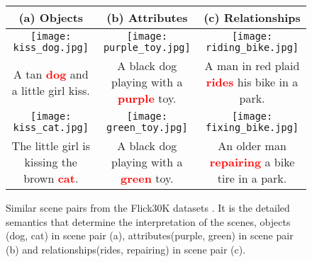 \documentclass[letterpaper]{article} \usepackage{aaai21}  \usepackage{times}  \usepackage{helvet} \usepackage{courier}  \usepackage[hyphens]{url}  \usepackage{graphicx} \urlstyle{rm} \def\UrlFont{\rm}  \usepackage{natbib}  \usepackage{caption} \frenchspacing  \setlength{\pdfpagewidth}{8.5in}  \setlength{\pdfpageheight}{11in}  \usepackage{cite}
\begin{document}
\begin{figure*}[t]
\centering
\begin{tabular}{ccc} 
\multicolumn{1}{c}{(a) Objects}  & \multicolumn{1}{c}{(b) Attributes}   & \multicolumn{1}{c}{(c) Relationships}         \\ 
\hline
\begin{minipage}{0.3\textwidth}
\centering
\texttt{[image: kiss\_dog.jpg]}
\end{minipage}
 & 
 \begin{minipage}{0.3\textwidth}
 \centering
\texttt{[image: purple\_toy.jpg]}
\end{minipage}
 & 
\begin{minipage}{0.3\textwidth}
\centering
\texttt{[image: riding\_bike.jpg]}
\end{minipage} 
\\ 
\multicolumn{1}{c}{\small{A tan \textcolor{red}{\textbf{dog}} and a little girl kiss.}}
&
\multicolumn{1}{c}{\small{A black dog playing with a \textcolor{red}{\textbf{purple}} toy.}}
&
\multicolumn{1}{c}{\small{
A man in red plaid \textcolor{red}{\textbf{rides}} his bike in a park.}}
\\

\begin{minipage}{0.3\textwidth}
\centering
\texttt{[image: kiss\_cat.jpg]}
\end{minipage}
 & 
 \begin{minipage}{0.3\textwidth}
 \centering
\texttt{[image: green\_toy.jpg]}
\end{minipage}
 & 
\begin{minipage}{0.30\textwidth}
\centering
\texttt{[image: fixing\_bike.jpg]}
\end{minipage} 
\\
\multicolumn{1}{c}{\small{The little girl is kissing the brown \textcolor{red}{\textbf{cat}}.}}
&
\multicolumn{1}{c}{\small{A black dog playing with a \textcolor{red}{\textbf{green}} toy.}}
&
\multicolumn{1}{c}{\small{
An older man \textcolor{red}{\textbf{repairing}} a bike tire in a park.}}
\\
\end{tabular}

\caption{Similar scene pairs from the Flick30K datasets \cite{young2014image}. It is the detailed semantics that determine the interpretation of the scenes, objects (dog, cat) in scene pair (a), attributes(purple, green) in scene pair (b) and relationships(rides, repairing) in scene pair (c). }
\label{tab_nodecase}
\end{figure*}
\end{document}
